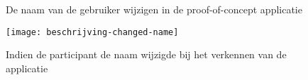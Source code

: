 \begin{figure}[h!]
	\centering
	\qquad
	\qquad
	\caption{De naam van de gebruiker wijzigen in de proof-of-concept applicatie}
	\label{fig:piggy:name}
\end{figure}

\begin{figure}[h]
	\centering
	\texttt{[image: beschrijving-changed-name]}
	\caption{Indien de participant de naam wijzigde bij het verkennen van de applicatie}
	\label{fig:beschrijving-changed-name}
\end{figure}
